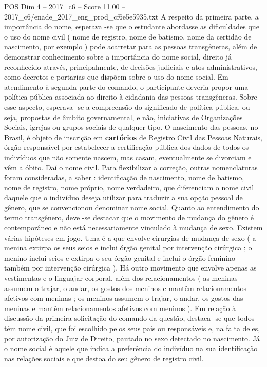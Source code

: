 \begin{textsample}{POS Dim 4 – 2017\_c6 – Score 11.00 – 2017\_c6/enade\_2017\_eng\_prod\_cf6e5e5935.txt}
A respeito da primeira parte, a importância do nome, esperava -se que o estudante abordasse as dificuldades que o uso do nome civil ( nome de registro, nome de batismo, nome da certidão de nascimento, por exemplo ) pode acarretar para as pessoas transgêneras, além de demonstrar conhecimento sobre a importância do nome social, direito já reconhecido através, principalmente, de decisões judiciais e atos administrativos, como decretos e portarias que dispõem sobre o uso do nome social.
Em atendimento à segunda parte do comando, o participante deveria propor uma política pública associada ao direito à cidadania das pessoas transgêneras.
Sobre esse aspecto, esperava -se a compreensão do significado de política pública, ou seja, propostas de âmbito governamental, e não, iniciativas de Organizações Sociais, igrejas ou grupos sociais de qualquer tipo.
O nascimento das pessoas, no Brasil, é objeto de inscrição em \textbf{cartórios} de Registro Civil das Pessoas Naturais, órgão responsável por estabelecer a certificação pública dos dados de todos os indivíduos que não somente nascem, mas casam, eventualmente se divorciam e vêm a óbito.
Daí o nome civil.
Para flexibilizar a correção, outras nomenclaturas foram consideradas, a saber : identificação de nascimento, nome de batismo, nome de registro, nome próprio, nome verdadeiro, que diferenciam o nome civil daquele que o indivíduo deseja utilizar para traduzir a sua opção pessoal de gênero, que se convencionou denominar nome social.
Quanto ao entendimento do termo transgênero, deve -se destacar que o movimento de mudança do gênero é contemporâneo e não está necessariamente vinculado à mudança de sexo.
Existem várias hipóteses em jogo.
Uma é a que envolve cirurgias de mudança de sexo ( a menina extirpa os seus seios e inclui órgão genital por intervenção cirúrgica ; o menino inclui seios e extirpa o seu órgão genital e inclui o órgão feminino também por intervenção cirúrgica ).
Há outro movimento que envolve apenas as vestimentas e o linguajar corporal, além dos relacionamentos ( as meninas assumem o trajar, o andar, os gostos dos meninos e mantêm relacionamentos afetivos com meninas ; os meninos assumem o trajar, o andar, os gostos das meninas e mantêm relacionamentos afetivos com meninos ).
Em relação à discussão da primeira solicitação do comando da questão, destaca -se que todos têm nome civil, que foi escolhido pelos seus pais ou responsáveis e, na falta deles, por autorização do Juiz de Direito, pautado no sexo detectado no nascimento.
Já o nome social é aquele que indica a preferência do indivíduo na sua identificação nas relações sociais e que destoa do seu gênero de registro civil.

\end{textsample}
